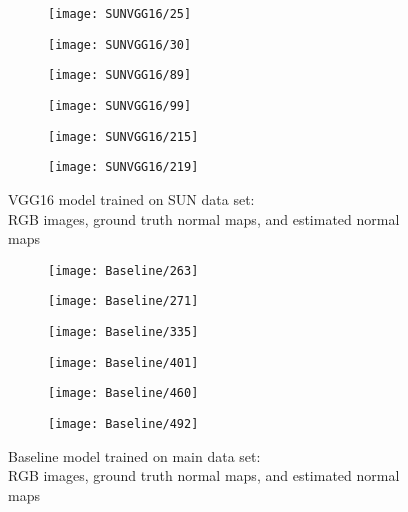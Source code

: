 \begin{figure}
    \centering
    \begin{subfigure}[b]{0.3\textwidth}
        \texttt{[image: SUNVGG16/25]}
    \end{subfigure}
    \begin{subfigure}[b]{0.3\textwidth}
        \texttt{[image: SUNVGG16/30]}
    \end{subfigure}
    \begin{subfigure}[b]{0.3\textwidth}
        \texttt{[image: SUNVGG16/89]}
    \end{subfigure}
    
    \begin{subfigure}[b]{0.3\textwidth}
        \texttt{[image: SUNVGG16/99]}
    \end{subfigure}
    \begin{subfigure}[b]{0.3\textwidth}
        \texttt{[image: SUNVGG16/215]}
    \end{subfigure}
    \begin{subfigure}[b]{0.3\textwidth}
        \texttt{[image: SUNVGG16/219]}
    \end{subfigure}
    \caption{VGG16 model trained on SUN data set: \\ RGB images, ground truth normal maps, and estimated normal maps}
    \label{fig:sunvgg1}
\end{figure}

\begin{figure}
    \centering
    \begin{subfigure}[b]{0.3\textwidth}
        \texttt{[image: Baseline/263]}
    \end{subfigure}
    \begin{subfigure}[b]{0.3\textwidth}
        \texttt{[image: Baseline/271]}
    \end{subfigure}
    \begin{subfigure}[b]{0.3\textwidth}
        \texttt{[image: Baseline/335]}
    \end{subfigure}
    
    \begin{subfigure}[b]{0.3\textwidth}
        \texttt{[image: Baseline/401]}
    \end{subfigure}
    \begin{subfigure}[b]{0.3\textwidth}
        \texttt{[image: Baseline/460]}
    \end{subfigure}
    \begin{subfigure}[b]{0.3\textwidth}
        \texttt{[image: Baseline/492]}
    \end{subfigure}
    \caption{Baseline model trained on main data set: \\ RGB images, ground truth normal maps, and estimated normal maps}
    \label{fig:baseline2}
\end{figure}

